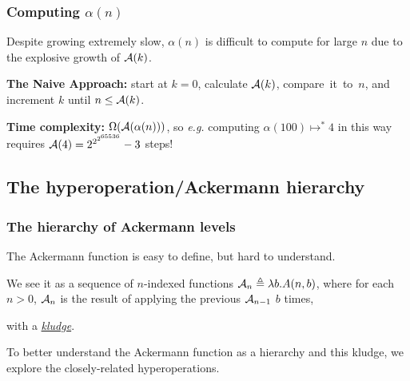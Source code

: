\begin{frame}
\frametitle{Computing $\alpha(n)$}
Despite growing extremely slow, $\alpha(n)$ is difficult to compute for large $n$ due to the explosive growth of $\mathcal{A}(k)$.

\bigskip

\textbf{The Naive Approach:} start at $k=0$, calculate $\mathcal{A}(k)$,
compare~it~to~$n$, and increment $k$ until $n \le \mathcal{A}(k)$.

\bigskip

\textbf{Time complexity:} $\Omega(\mathcal{A}(\alpha(n)))$,
so \emph{e.g.} computing $\alpha(100) \mapsto^{*} 4$ in this way requires
$\mathcal{A}(4) = 2^{2^{2^{65536}}}-3$ steps!
\end{frame}

\subsection*{The hyperoperation/Ackermann hierarchy}

\begin{frame}
\frametitle{The hierarchy of Ackermann levels}
The Ackermann function is easy to define, but hard to
understand.

We see it as
a sequence of $n$-indexed functions $\mathcal{A}_n \triangleq \lambda b.A(n,b)$, where for each $n>0$, $\mathcal{A}_n$ is the result of applying the previous $\mathcal{A}_{n-1}$ $b$ times,

with a
\href{https://github.com/inv-ack/inv-ack/blob/7270e64a2600b771f2b1b1b151f7d13fb2ae6c97/repeater.v\#L161-L177}{\emph{kludge}}. %

\bigskip

To better understand the Ackermann function as a hierarchy and this kludge, we explore the closely-related hyperoperations.

\end{frame}


